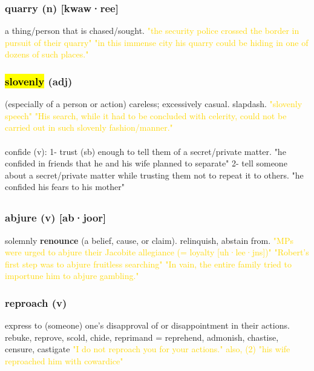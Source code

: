 \documentclass{proc}
\begin{document}
	\subsubsection{\textcolor{brickred}{quarry} (n) [kwaw·ree]}
	a thing/person that is chased/sought.
	\textcolor{gold}{"the security police crossed the border in pursuit of their quarry" "in  this immense city his quarry could be hiding in one of dozens of such places."}
	
	\subsubsection{\textcolor{brickred}{\hl{slovenly}} (adj)}
	(especially of a person or action) careless; excessively casual. slapdash.
	\textcolor{gold}{"slovenly speech" "His search, while it had to be concluded with  celerity,  could not  be  carried out  in such slovenly fashion/manner."}\\\\
	confide (v): 1- trust (sb) enough to tell them of a secret/private matter. "he confided in friends that he and his wife planned to separate" 2- tell someone about a secret/private matter while trusting them not to repeat it to others.
	"he confided his fears to his mother" 
	
	\newpage
	\subsection{}
	\subsubsection{\textcolor{brickred}{abjure} (v) [ab·joor]}
	solemnly \textbf{renounce} (a belief, cause, or claim). relinquish, abstain from.
	\textcolor{gold}{"MPs were urged to abjure their Jacobite allegiance (= loyalty [uh·lee·jns])" "Robert's first step was to abjure fruitless searching" "In vain, the entire family tried to importune him to abjure gambling."}
	
	\subsubsection{\textcolor{brickred}{reproach} (v)}
	express to (someone) one's disapproval of or disappointment in their actions. 
	rebuke,
	reprove,
	scold,
	chide,
	reprimand = reprehend,
	admonish,
	chastise,
	censure,
	castigate
	\textcolor{gold}{"I do not reproach you for your actions." also, (2) "his wife reproached him with cowardice"}
	
\end{document}

